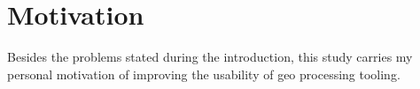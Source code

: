 \section{Motivation}

Besides the problems stated during the introduction, this study carries my personal motivation of improving the usability of geo processing tooling. 

